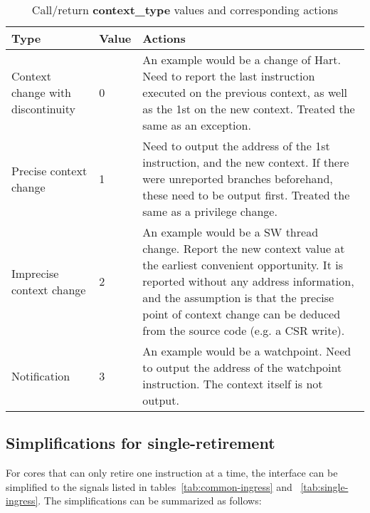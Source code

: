 \begin{table}[htp]
    \centering
    \caption{Call/return \textbf{context\_type} values and corresponding actions}
    \label{tab:context-type}
    \begin{tabulary}{\textwidth}{|l|l|p{80mm}|}
        \hline
        \textbf {Type} & \textbf {Value} & \textbf {Actions} \\
        \hline
        Context change with discontinuity & 0 &  An example would be a change of Hart.\newline
        Need to report the last instruction executed on the previous context, as well as the 1st on the new context.\newline
        Treated the same as an exception.\\
        \hline
        Precise context change & 1 & Need to output the address of the 1st instruction, and the new context.\newline
        If there were unreported branches beforehand, these need to be output first.\newline
        Treated the same as a privilege change.\\
        \hline
        Imprecise context change & 2 & An example would be a SW thread change.\newline
        Report the new context value at the earliest convenient opportunity.\newline
        It is reported without any address information, and the assumption is that the precise point of context change can be deduced from the source code (e.g. a CSR write). \\
        \hline
        Notification & 3 & An example would be a watchpoint.\newline
        Need to output the address of the watchpoint instruction.\newline
        The context itself is not output.\\
        \hline
    \end{tabulary}
\end{table}

\subsection {Simplifications for single-retirement} \label{sec:single-retire}

For cores that can only retire one instruction at a time, the interface can be simplified to
the signals listed in tables~\ref{tab:common-ingress} and ~\ref{tab:single-ingress}.  The 
simplifications can be summarized as follows:
 
